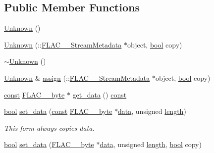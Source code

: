 \subsection*{Public Member Functions}
\begin{DoxyCompactItemize}
\item 
\hyperlink{class_f_l_a_c_1_1_metadata_1_1_unknown_ae234a86bae738a5e12964513ce3e548d}{Unknown} ()
\item 
\hyperlink{class_f_l_a_c_1_1_metadata_1_1_unknown_a2fb76f94e891c3eea7209a461cab4279}{Unknown} (\+::\hyperlink{struct_f_l_a_c_____stream_metadata}{F\+L\+A\+C\+\_\+\+\_\+\+Stream\+Metadata} $\ast$object, \hyperlink{mac_2config_2i386_2lib-src_2libsoxr_2soxr-config_8h_abb452686968e48b67397da5f97445f5b}{bool} copy)
\item 
\hyperlink{class_f_l_a_c_1_1_metadata_1_1_unknown_ae06afb545cb63656e3e30204aaddc961}{$\sim$\+Unknown} ()
\item 
\hyperlink{class_f_l_a_c_1_1_metadata_1_1_unknown}{Unknown} \& \hyperlink{class_f_l_a_c_1_1_metadata_1_1_unknown_a4dc5e794c8d529245888414b2bf7d404}{assign} (\+::\hyperlink{struct_f_l_a_c_____stream_metadata}{F\+L\+A\+C\+\_\+\+\_\+\+Stream\+Metadata} $\ast$object, \hyperlink{mac_2config_2i386_2lib-src_2libsoxr_2soxr-config_8h_abb452686968e48b67397da5f97445f5b}{bool} copy)
\item 
\hyperlink{getopt1_8c_a2c212835823e3c54a8ab6d95c652660e}{const} \hyperlink{ordinals_8h_a5eb569b12d5b047cdacada4d57924ee3}{F\+L\+A\+C\+\_\+\+\_\+byte} $\ast$ \hyperlink{class_f_l_a_c_1_1_metadata_1_1_unknown_ae12a97c1ba1ea24911abe94cbac273b4}{get\+\_\+data} () \hyperlink{getopt1_8c_a2c212835823e3c54a8ab6d95c652660e}{const} 
\item 
\hyperlink{mac_2config_2i386_2lib-src_2libsoxr_2soxr-config_8h_abb452686968e48b67397da5f97445f5b}{bool} \hyperlink{class_f_l_a_c_1_1_metadata_1_1_unknown_a8621d3eff6af5acc278297b3d2837a76}{set\+\_\+data} (\hyperlink{getopt1_8c_a2c212835823e3c54a8ab6d95c652660e}{const} \hyperlink{ordinals_8h_a5eb569b12d5b047cdacada4d57924ee3}{F\+L\+A\+C\+\_\+\+\_\+byte} $\ast$\hyperlink{lib_2expat_8h_ac39e72a1de1cb50dbdc54b08d0432a24}{data}, unsigned \hyperlink{test__lib_f_l_a_c_2format_8c_ac94dc16b22556ba5fa815655f27442da}{length})
\begin{DoxyCompactList}\small\item\em This form always copies {\itshape data}. \end{DoxyCompactList}\item 
\hyperlink{mac_2config_2i386_2lib-src_2libsoxr_2soxr-config_8h_abb452686968e48b67397da5f97445f5b}{bool} \hyperlink{class_f_l_a_c_1_1_metadata_1_1_unknown_a491a3fd22bf7b0b7079496e49e11b4e2}{set\+\_\+data} (\hyperlink{ordinals_8h_a5eb569b12d5b047cdacada4d57924ee3}{F\+L\+A\+C\+\_\+\+\_\+byte} $\ast$\hyperlink{lib_2expat_8h_ac39e72a1de1cb50dbdc54b08d0432a24}{data}, unsigned \hyperlink{test__lib_f_l_a_c_2format_8c_ac94dc16b22556ba5fa815655f27442da}{length}, \hyperlink{mac_2config_2i386_2lib-src_2libsoxr_2soxr-config_8h_abb452686968e48b67397da5f97445f5b}{bool} copy)
\end{DoxyCompactItemize}
